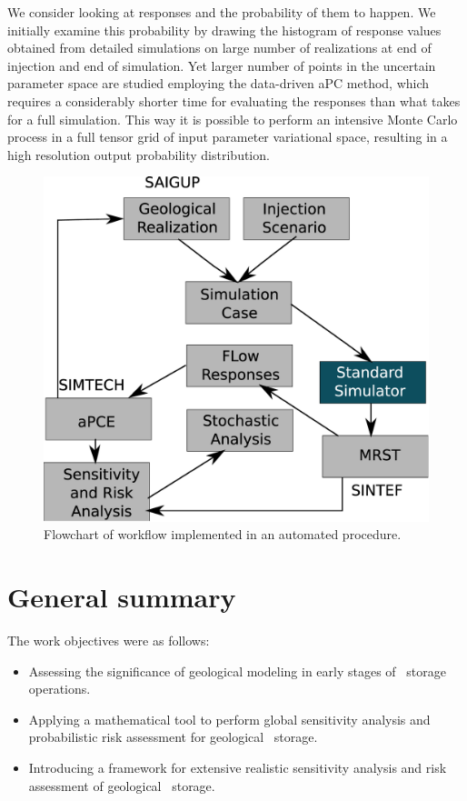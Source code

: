 We consider looking at responses and the probability of them to happen. We
initially examine this probability by drawing the histogram of response values
obtained from detailed simulations on large number of realizations at end of injection and end of simulation.
Yet larger number of points in the uncertain parameter space are studied
employing the data-driven aPC method, which requires a considerably shorter time
for evaluating the responses than what takes for a full simulation. This way it is possible to perform an intensive
Monte Carlo process in a full tensor grid of input parameter variational space,
resulting in a high resolution output probability distribution.


\begin{figure}[thb]
  \centering
  \includegraphics[width=0.65 \linewidth]{./figurer/ENCL} 
  \caption{Flowchart of workflow implemented in an automated procedure.}
  \label{fig:encl}
%
\end{figure}

\section{General summary}
\label{sec:generalSummary}

The work objectives were as follows:
\begin{itemize}
\item Assessing the significance of geological modeling in early stages of \coo\ storage operations.
\item Applying a mathematical tool to perform global sensitivity analysis and probabilistic risk assessment for geological \coo\ storage.
\item Introducing a framework for extensive realistic sensitivity analysis and risk assessment of geological \coo\ storage.
\end{itemize}

